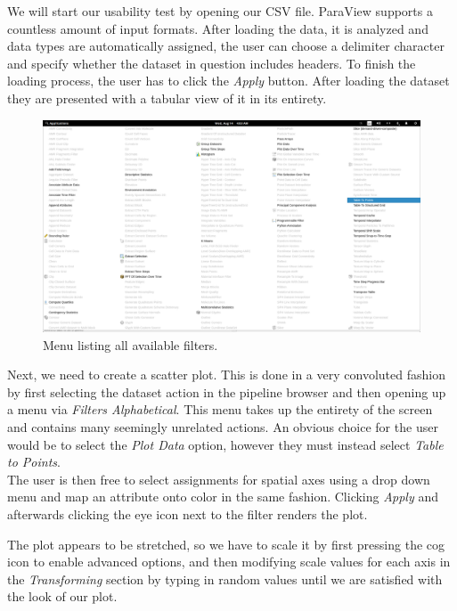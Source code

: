 \documentclass{article}
\begin{document}
We will start our usability test by opening our CSV file. ParaView supports a countless amount of input formats. After loading the data, it is analyzed and data types are automatically assigned, the user can choose a delimiter character and specify whether the dataset in question includes headers. To finish the loading process, the user has to click the \emph{Apply} button. After loading the dataset they are presented with a tabular view of it in its entirety.\\

\begin{figure}[!h]
\centering
\includegraphics[scale=0.18]{images/paraview_menu}
\caption{Menu listing all available filters.}
\label{fig:paraviewmenu}
\end{figure}

Next, we need to create a scatter plot. This is done in a very convoluted fashion by first selecting the dataset action in the pipeline browser and then opening up a menu via \emph{Filters \textrightarrow{} Alphabetical}. This menu takes up the entirety of the screen and contains many seemingly unrelated actions. An obvious choice for the user would be to select the \emph{Plot Data} option, however they must instead select \emph{Table to Points}.\\

The user is then free to select assignments for spatial axes using a drop down menu and map an attribute onto color in the same fashion. Clicking \emph{Apply} and afterwards clicking the eye icon next to the filter renders the plot.\\

\newpage

The plot appears to be stretched, so we have to scale it by first pressing the cog icon to enable advanced options, and then modifying scale values for each axis in the \emph{Transforming} section by typing in random values until we are satisfied with the look of our plot.\\
\end{document}
